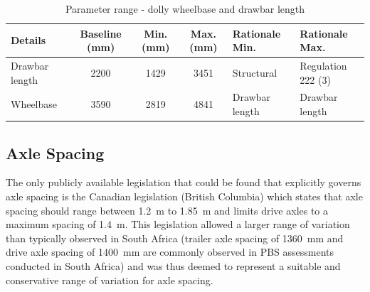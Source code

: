 \begin{table}[H]
	\centering\footnotesize
	\begin{threeparttable}

		\begin{tabulary}{\textwidth}{lcccll}
			\toprule
			\textbf{Details} & \textbf{Baseline (mm)} & \textbf{Min. (mm)} & \textbf{Max. (mm)} & \textbf{Rationale Min.} & \textbf{Rationale Max.} \\

			\midrule
			Drawbar length & 2200  & 1429  & 3451  & Structural & Regulation 222 (3) \\
			Wheelbase      & 3590  & 2819  & 4841  & Drawbar length & Drawbar length \\
			\bottomrule

		\end{tabulary}

		\caption{Parameter range - dolly wheelbase and drawbar length}
		\label{table:parameter-range-dolly-pintle-hitch-length}


	\end{threeparttable}
\end{table}

\subsection{Axle Spacing}\label{section:pr-axle-spacing}

The only publicly available legislation that could be found that explicitly governs axle spacing is the Canadian legislation (British Columbia) \cite{StatutesRegulations} which states that axle spacing should range between 1.2~m to 1.85~m and limits drive axles to a maximum spacing of 1.4~m. This legislation allowed a larger range of variation than typically observed in South Africa (trailer axle spacing of 1360~mm and drive axle spacing of 1400~mm are commonly observed in PBS assessments conducted in South Africa) and was thus deemed to represent a suitable and conservative range of variation for axle spacing.

